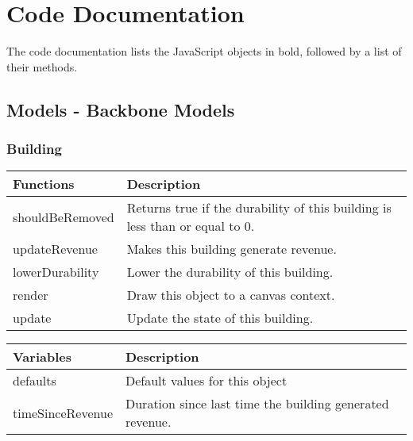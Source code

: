 \chapter{Code Documentation}

The code documentation lists the JavaScript objects in bold, followed by a list of their methods.

\clearpage 

\section{Models - Backbone Models}

\subsection*{Building}
	\begin{table}[H]
	\begin{tabular}{p{4cm} | p{8cm} }
	\hline
	\rowcolor{gray}
	Functions & Description \\ \hline
	shouldBeRemoved & Returns true if the durability of this building is less than or equal to 0. \\ \hline
	updateRevenue & Makes this building generate revenue. \\ \hline
	lowerDurability & Lower the durability of this building. \\ \hline
	render & Draw this object to a canvas context. \\ \hline
	update & Update the state of this building. \\ \hline
	\end{tabular}
	\end{table}

	\begin{table}[H]
	\begin{tabular}{p{4cm} | p{8cm} }
	\hline
	\rowcolor{gray}
	Variables & Description \\ \hline
	defaults & Default values for this object \\ \hline
	timeSinceRevenue & Duration since last time the building generated revenue. \\ \hline

	\end{tabular}
	\end{table}

